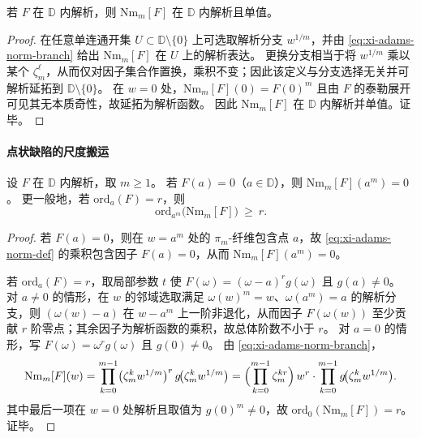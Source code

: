 \begin{proposition}[单值解析性]\label{prop:xi-adams-norm-holomorphic}
若 \(F\) 在 \(\mathbb{D}\) 内解析，则 \(\mathrm{Nm}_m[F]\) 在 \(\mathbb{D}\) 内解析且单值。
\end{proposition}

\begin{proof}
在任意单连通开集 \(U\subset\mathbb{D}\setminus\{0\}\) 上可选取解析分支 \(w^{1/m}\)，并由 \eqref{eq:xi-adams-norm-branch} 给出 \(\mathrm{Nm}_m[F]\) 在 \(U\) 上的解析表达。
更换分支相当于将 \(w^{1/m}\) 乘以某个 \(\zeta_m^\ell\)，从而仅对因子集合作置换，乘积不变；因此该定义与分支选择无关并可解析延拓到 \(\mathbb{D}\setminus\{0\}\)。
在 \(w=0\) 处，\(\mathrm{Nm}_m[F](0)=F(0)^m\) 且由 \(F\) 的泰勒展开可见其无本质奇性，故延拓为解析函数。
因此 \(\mathrm{Nm}_m[F]\) 在 \(\mathbb{D}\) 内解析并单值。证毕。
\end{proof}

\paragraph{点状缺陷的尺度搬运}
\begin{theorem}[点状缺陷的尺度搬运]\label{thm:xi-adams-norm-zero-transport}
设 \(F\) 在 \(\mathbb{D}\) 内解析，取 \(m\ge 1\)。
若 \(F(a)=0\)（\(a\in\mathbb{D}\)），则 \(\mathrm{Nm}_m[F](a^m)=0\)。
更一般地，若 \(\mathrm{ord}_a(F)=r\)，则
\[
\mathrm{ord}_{a^m}\bigl(\mathrm{Nm}_m[F]\bigr)\ \ge\ r.
\]
\end{theorem}

\begin{proof}
若 \(F(a)=0\)，则在 \(w=a^m\) 处的 \(\pi_m\)-纤维包含点 \(a\)，故 \eqref{eq:xi-adams-norm-def} 的乘积包含因子 \(F(a)=0\)，从而 \(\mathrm{Nm}_m[F](a^m)=0\)。
\par
若 \(\mathrm{ord}_a(F)=r\)，取局部参数 \(t\) 使 \(F(\omega)=(\omega-a)^r g(\omega)\) 且 \(g(a)\neq 0\)。
对 \(a\neq 0\) 的情形，在 \(w\) 的邻域选取满足 \(\omega(w)^m=w\)、\(\omega(a^m)=a\) 的解析分支，则
\((\omega(w)-a)\) 在 \(w-a^m\) 上一阶非退化，从而因子 \(F(\omega(w))\) 至少贡献 \(r\) 阶零点；其余因子为解析函数的乘积，故总体阶数不小于 \(r\)。
对 \(a=0\) 的情形，写 \(F(\omega)=\omega^{r}g(\omega)\) 且 \(g(0)\neq 0\)。
由 \eqref{eq:xi-adams-norm-branch}，
\[
\mathrm{Nm}_m[F](w)
=\prod_{k=0}^{m-1}\bigl(\zeta_m^k w^{1/m}\bigr)^{r}\,g\!\bigl(\zeta_m^k w^{1/m}\bigr)
=\Bigl(\prod_{k=0}^{m-1}\zeta_m^{kr}\Bigr)\,w^{r}\cdot \prod_{k=0}^{m-1}g\!\bigl(\zeta_m^k w^{1/m}\bigr).
\]
其中最后一项在 \(w=0\) 处解析且取值为 \(g(0)^m\neq 0\)，故 \(\mathrm{ord}_{0}(\mathrm{Nm}_m[F])=r\)。
证毕。
\end{proof}

